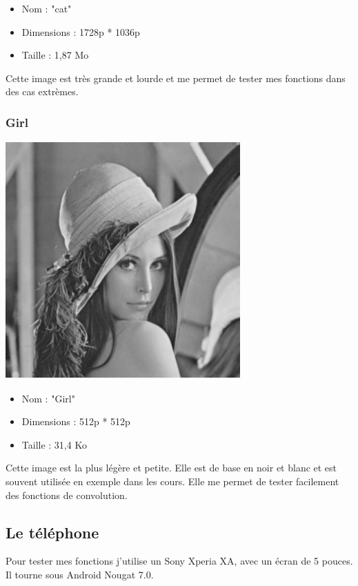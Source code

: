 \documentclass{article}
\begin{document}
\begin{itemize}
\item Nom : "cat"
\item Dimensions : 1728p * 1036p
\item Taille : 1,87 Mo
\end{itemize}
\medbreak

Cette image est très grande et lourde et me permet de tester mes fonctions dans des cas extrèmes.

\subsubsection{Girl}
\begin{center} 
    \includegraphics[width=9cm]{../Image_fonctions/Lenna/Base.PNG}
\end{center}
\bigbreak

\begin{itemize}
\item Nom : "Girl"
\item Dimensions : 512p * 512p
\item Taille : 31,4 Ko
\end{itemize}
\medbreak

Cette image est la plus légère et petite. Elle est de base en noir et blanc et est souvent utilisée en exemple dans les cours.
Elle me permet de tester facilement des fonctions de convolution.

\subsection{Le téléphone}
Pour tester mes fonctions j'utilise un Sony Xperia XA, avec un écran de 5 pouces.
Il tourne sous Android Nougat 7.0.
\end{document}
